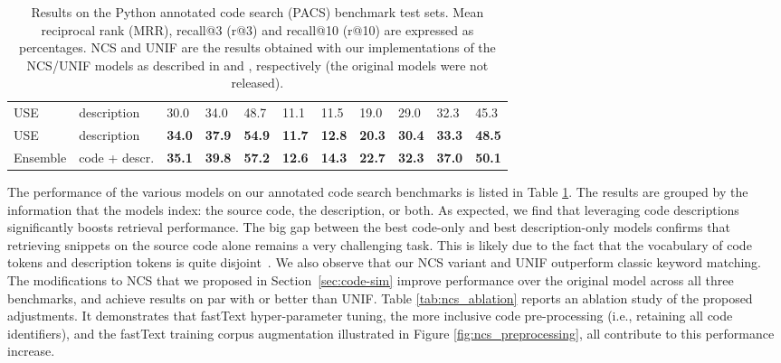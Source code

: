 \documentclass[12pt,conference, onecolumn]{IEEEtran}
\begin{document}
\begin{table}[]
\begin{tabular}{@{}lllllllllll@{}}
USE      & description     & 30.0       & 34.0       & 48.7      & 11.1        & 11.5       & 19.0       & 29.0       & 32.3      & 45.3      \\
USE & description     & \textbf{34.0}       & \textbf{37.9}       & \textbf{54.9}      & \textbf{11.7}        & \textbf{12.8} & \textbf{20.3}       & \textbf{30.4}       & \textbf{33.3}      & \textbf{48.5}    \\ \midrule
Ensemble        & code + descr.   & \textbf{35.1}         &    \textbf{39.8}     &    \textbf{57.2}       &     \textbf{12.6}        &      \textbf{14.3}     &      \textbf{22.7}      &           \textbf{32.3} &     \textbf{37.0}      &     \textbf{50.1}      \\ \bottomrule
\end{tabular}
\caption{Results on the Python annotated code search (PACS) benchmark test sets. Mean reciprocal rank (MRR), recall@3 (r@3) and recall@10 (r@10) are expressed as percentages. NCS and UNIF are the results obtained with our implementations of the NCS/UNIF models as described in  and , respectively (the original models were not released). }
\label{tab:results}
\end{table} 
The performance of the various models on our annotated code search benchmarks is listed in Table \ref{tab:results}. The results are grouped by the information that the models index: the source code,  the description, or both. As expected, we find that leveraging code descriptions significantly boosts retrieval performance. The big gap between the best code-only and best description-only models confirms that retrieving snippets on the source code alone remains a very challenging task. This is likely due to the fact that the vocabulary of code tokens and description tokens is quite disjoint~\cite{sachdev2018retrieval}. We also observe that our NCS variant and UNIF outperform classic keyword matching. The modifications to NCS that we proposed in Section~\ref{sec:code-sim} improve performance over the original model across all three benchmarks, and achieve results on par with or better than UNIF. Table \ref{tab:ncs_ablation} reports an ablation study of the proposed adjustments. It demonstrates that fastText hyper-parameter tuning, the more inclusive code pre-processing (i.e., retaining all code identifiers), and the fastText training corpus augmentation illustrated in Figure \ref{fig:ncs_preprocessing}, all contribute to this performance increase.  
\end{document}
